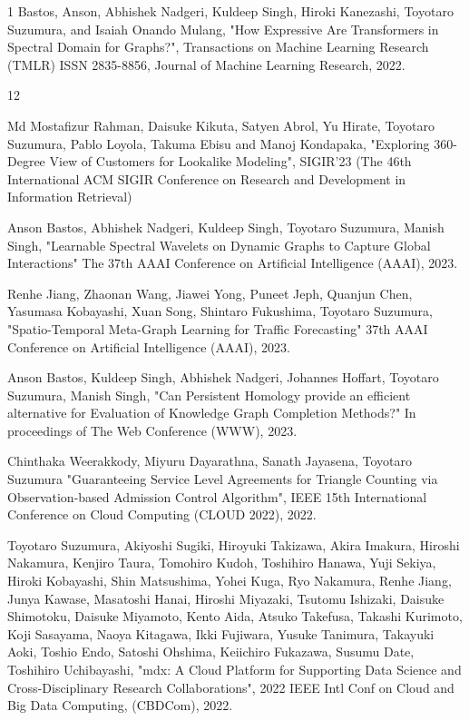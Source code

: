 

% 
\begin{雑誌論文}{1}
Bastos, Anson, Abhishek Nadgeri, Kuldeep Singh, Hiroki Kanezashi, Toyotaro Suzumura, and Isaiah Onando Mulang, "How Expressive Are Transformers in Spectral Domain for Graphs?", Transactions on Machine Learning Research (TMLR) ISSN 2835-8856, Journal of Machine Learning Research, 2022.
\end{雑誌論文}


\begin{査読付}{12}

Md Mostafizur Rahman, Daisuke Kikuta, Satyen Abrol, Yu Hirate, Toyotaro Suzumura, Pablo Loyola, Takuma Ebisu and Manoj Kondapaka, "Exploring 360-Degree View of Customers for Lookalike Modeling",  SIGIR'23 (The 46th International ACM
SIGIR Conference on Research and Development in Information
Retrieval) 


Anson Bastos, Abhishek Nadgeri, Kuldeep Singh, Toyotaro Suzumura, Manish Singh,
"Learnable Spectral Wavelets on Dynamic Graphs to Capture Global Interactions"
The 37th AAAI Conference on Artificial Intelligence (AAAI), 2023.

Renhe Jiang, Zhaonan Wang, Jiawei Yong, Puneet Jeph, Quanjun Chen, Yasumasa Kobayashi, Xuan Song, Shintaro Fukushima, Toyotaro Suzumura,
"Spatio-Temporal Meta-Graph Learning for Traffic Forecasting"
37th AAAI Conference on Artificial Intelligence (AAAI), 2023.

Anson Bastos, Kuldeep Singh, Abhishek Nadgeri, Johannes Hoffart, Toyotaro Suzumura, Manish Singh,
"Can Persistent Homology provide an efficient alternative for Evaluation of Knowledge Graph Completion Methods?"
In proceedings of The Web Conference (WWW), 2023.


Chinthaka Weerakkody, Miyuru Dayarathna, Sanath Jayasena, Toyotaro Suzumura
"Guaranteeing Service Level Agreements for Triangle Counting via Observation-based Admission Control Algorithm", IEEE 15th International Conference on Cloud Computing (CLOUD 2022), 2022.

Toyotaro Suzumura, Akiyoshi Sugiki, Hiroyuki Takizawa, Akira Imakura, Hiroshi Nakamura, Kenjiro Taura, Tomohiro Kudoh, Toshihiro Hanawa, Yuji Sekiya, Hiroki Kobayashi, Shin Matsushima, Yohei Kuga, Ryo Nakamura, Renhe Jiang, Junya Kawase, Masatoshi Hanai, Hiroshi Miyazaki, Tsutomu Ishizaki, Daisuke Shimotoku, Daisuke Miyamoto, Kento Aida, Atsuko Takefusa, Takashi Kurimoto, Koji Sasayama, Naoya Kitagawa, Ikki Fujiwara, Yusuke Tanimura, Takayuki Aoki, Toshio Endo, Satoshi Ohshima, Keiichiro Fukazawa, Susumu Date, Toshihiro Uchibayashi,
"mdx: A Cloud Platform for Supporting Data Science and Cross-Disciplinary Research Collaborations", 2022 IEEE Intl Conf on Cloud and Big Data Computing, (CBDCom), 2022.


\end{査読付}
